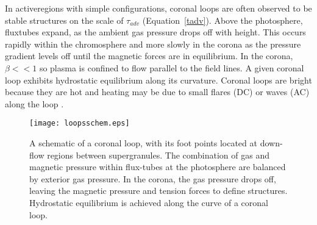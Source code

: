 In \glspl{activeregion} with simple configurations, coronal loops are often observed to be stable structures on the scale of $\tau_{adv}$ (Equation~\ref{tadv}). Above the photosphere, \glspl{fluxtube} expand, as the ambient gas pressure drops off with height. This occurs rapidly within the chromosphere and more slowly in the corona as the pressure gradient levels off until the magnetic forces are in equilibrium. In the corona, $\beta << 1$ so plasma is confined to flow parallel to the field lines. A given coronal loop exhibits hydrostatic equilibrium along its curvature. Coronal loops are bright because they are hot and heating may be due to small flares (DC) or waves (AC) along the loop \citep{Reale:2010}. %

\begin{figure}[!t]
\centerline{\texttt{[image: loopsschem.eps]}}
\caption[A schematic of a coronal loop.]{A schematic of a coronal loop, with its foot points located at down-flow regions between supergranules. The combination of gas and magnetic pressure within flux-tubes at the photosphere are balanced by exterior gas pressure. In the corona, the gas pressure drops off, leaving the magnetic pressure and tension forces to define structures. Hydrostatic equilibrium is achieved along the curve of a coronal loop.}
\label{fig:loopschem}
\end{figure}

